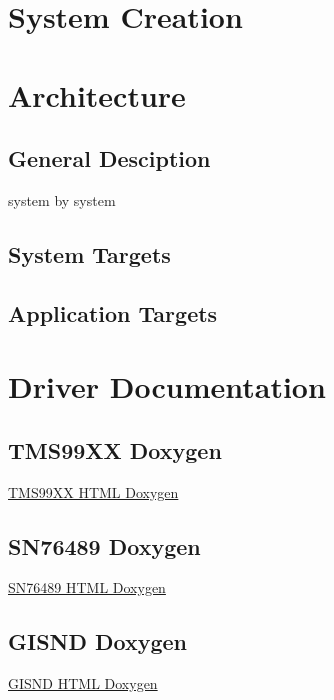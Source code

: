 \documentclass{article}
\begin{document}
  \newpage

  \section{System Creation}

  \newpage

  \section{Architecture}
  \subsection{General Desciption}

  \par
  system by system

  \subsection{System Targets}

  \newpage

  \subsection{Application Targets}

  \section{Driver Documentation}

  \subsection{TMS99XX Doxygen}
  \href{https://sparkletron.github.io/RODAC/manual/dox/tms99XX/html/index.html}{TMS99XX HTML Doxygen}

  \subsection{SN76489 Doxygen}
  \href{https://sparkletron.github.io/RODAC/manual/dox/sn76489/html/index.html}{SN76489 HTML Doxygen}

  \subsection{GISND Doxygen}
  \href{https://sparkletron.github.io/RODAC/manual/dox/gisnd/html/index.html}{GISND HTML Doxygen}
\end{document}
